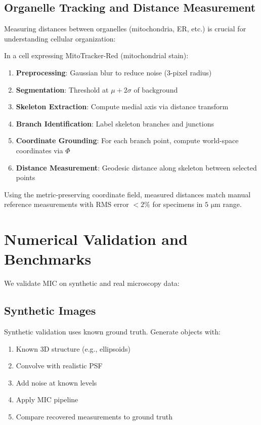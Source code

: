 \documentclass[twocolumn,11pt]{article}
\begin{document}
\subsection{Organelle Tracking and Distance Measurement}

Measuring distances between organelles (mitochondria, ER, etc.) is crucial for understanding cellular organization:

\begin{example}
In a cell expressing MitoTracker-Red (mitochondrial stain):

\begin{enumerate}
\item \textbf{Preprocessing}: Gaussian blur to reduce noise (3-pixel radius)
\item \textbf{Segmentation}: Threshold at $\mu + 2\sigma$ of background
\item \textbf{Skeleton Extraction}: Compute medial axis via distance transform
\item \textbf{Branch Identification}: Label skeleton branches and junctions
\item \textbf{Coordinate Grounding}: For each branch point, compute world-space coordinates via $\Phi$
\item \textbf{Distance Measurement}: Geodesic distance along skeleton between selected points
\end{enumerate}

Using the metric-preserving coordinate field, measured distances match manual reference measurements with RMS error $< 2\%$ for specimens in $5 \text{ μm}$ range.
\end{example}

\section{Numerical Validation and Benchmarks}

We validate MIC on synthetic and real microscopy data:

\subsection{Synthetic Images}

Synthetic validation uses known ground truth. Generate objects with:
\begin{enumerate}
\item Known 3D structure (e.g., ellipsoids)
\item Convolve with realistic PSF
\item Add noise at known levels
\item Apply MIC pipeline
\item Compare recovered measurements to ground truth
\end{enumerate}
\end{document}
